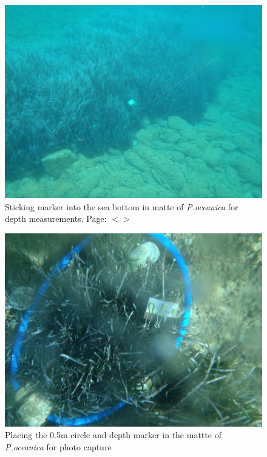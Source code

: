 \documentclass[11pt]{article}
\begin{document}
\begin{appendices}
\begin{figure}[H]
	\centering
	\includegraphics[scale=0.4]{photo-3.jpg}
	\caption{Sticking marker into the sea bottom in matte of \textit{P.oceanica} for depth measurements. Page: $<$\pageref{page-24}$>$}
	\label{fig:A.54}
\end{figure}

\begin{figure}[H]
	\centering
	\includegraphics[scale=0.4]{photo-5.jpg}
	\caption{Placing the 0.5m circle and depth marker in the mattte of \textit{P.oceanica} for photo capture}
	\label{fig:A.55}
\end{figure}


\end{appendices}
\end{document}
